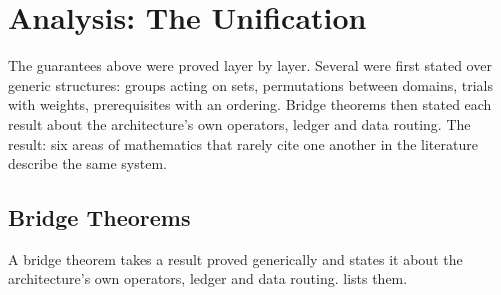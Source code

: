 \documentclass[11pt]{article}
\theoremstyle{remark}
\begin{document}

\section{Analysis: The Unification}
\label{sec:unification}

The guarantees above were proved layer by layer. Several were first stated over generic
structures: groups acting on sets, permutations between domains, trials with weights,
prerequisites with an ordering. Bridge theorems then stated each result about the
architecture's own operators, ledger and data routing. The result: six areas of
mathematics that rarely cite one another in the literature describe the same system.

\subsection{Bridge Theorems}

A bridge theorem takes a result proved generically and states it about the architecture's
own operators, ledger and data routing.  lists them.
\end{document}
